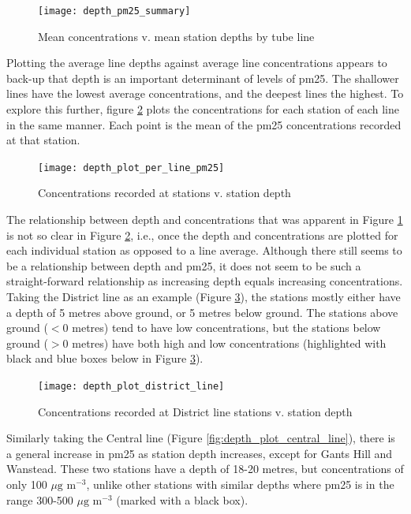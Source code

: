 \begin{figure}[H]
\centering
\texttt{[image: depth\_pm25\_summary]}
\caption{Mean concentrations v. mean station depths by tube line}
\label{fig:concentrations_depth_summary}
\end{figure}

Plotting the average line depths against average line concentrations appears to back-up that depth is an important determinant of levels of \gls{pm25}. The shallower lines have the lowest average concentrations, and the deepest lines the highest. To explore this further, figure \ref{fig:depth_plot_per_line_pm25} plots the concentrations for each station of each line in the same manner. Each point is the mean of the \gls{pm25} concentrations recorded at that station.

\begin{figure}[H]
\centering
\texttt{[image: depth\_plot\_per\_line\_pm25]}
\caption{Concentrations recorded at stations v. station depth}
\label{fig:depth_plot_per_line_pm25}
\end{figure}

The relationship between depth and concentrations that was apparent in Figure \ref{fig:concentrations_depth_summary} is not so clear in Figure \ref{fig:depth_plot_per_line_pm25}, i.e., once the depth and concentrations are plotted for each individual station as opposed to a line average. Although there still seems to be a relationship between depth and \gls{pm25}, it does not seem to be such a straight-forward relationship as increasing depth equals increasing concentrations. Taking the District line as an example (Figure \ref{fig:depth_plot_district_line}), the stations mostly either have a depth of 5 metres above ground, or 5 metres below ground. The stations above ground ($<0$ metres) tend to have low concentrations, but the stations below ground ($>0$ metres) have both high and low concentrations (highlighted with black and blue boxes below in Figure \ref{fig:depth_plot_district_line}).

\begin{figure}[H]
\centering
\texttt{[image: depth\_plot\_district\_line]}
\caption{Concentrations recorded at District line stations v. station depth}
\label{fig:depth_plot_district_line}
\end{figure}

Similarly taking the Central line (Figure \ref{fig:depth_plot_central_line}), there is a general increase in \gls{pm25} as station depth increases, except for Gants Hill and Wanstead. These two stations have a depth of 18-20 metres, but concentrations of only 100 $\mu \text{g m}^{-3}$, unlike other stations with similar depths where \gls{pm25} is in the range 300-500 $\mu \text{g m}^{-3}$ (marked with a black box).

